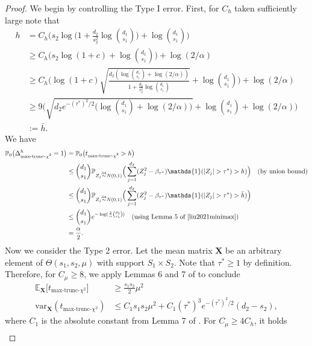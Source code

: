 \documentclass{article}
\newcommand{\X}{\mathbf{X}}
\newcommand{\bbP}{\mathbb{P}}
\newcommand{\EE}{\mathbb{E}}
\newcommand{\var}{\textrm{var}}
\newcommand{\one}{\mathds{1}}
\newcommand{\iid}{\overset{\textrm{iid}}{\sim}}
\newcommand{\chisqmax}{\text{max-trunc-$\chi^2$}}
\theoremstyle{remark}
\begin{document}
\begin{proof}
    We begin by controlling the Type I error. 
    First, for $C_h$ taken sufficiently large note that
    \begin{align*}
        h &= C_h\Big(s_2\log\Big(1 + \frac{d_2}{s_2^2}\log {d_1 \choose s_1}\Big) + \log {d_1 \choose s_1}\Big) \\
        &\geq C_h\Big(s_2\log(1 + c) + \log {d_1 \choose s_1}\Big) + 
        \log(2/\alpha)\\
        &\geq C_h\Big(\log(1+c)\sqrt{\frac{d_2(\log {d_1 \choose s_1} + \log(2/\alpha))}{1 + \frac{d_2}{s_2^2}\log {d_1 \choose s_1}}} + \log {d_1 \choose s_1}\Big) + \log(2/\alpha) \\
        &\geq 9\Bigg(\sqrt{d_2 e^{-(\tau^*)^2/2}\Big(\log{d_1 \choose s_1} + \log(2/\alpha)\Big)} + \log {d_1 \choose s_1} + \log(2/\alpha)\Bigg) \\
        &:= \bar{h}.
    \end{align*}
    We have 
    \begin{align*}
        \bbP_0\big(\Delta_\chisqmax^h = 1\big) &= \bbP_0\big(t_{\chisqmax} > h\big) \\
        &\leq {d_1 \choose s_1}\bbP_{Z_j \iid N(0,1)}\Big(\sum_{j = 1}^{d_2}(Z_j^2 - \beta_{\tau^*})\one(|Z_j| > \tau^*) > h)\Big) \quad \text{(by union bound)} \\
        &\leq {d_1 \choose s_1}\bbP_{Z_j \iid N(0,1)}\Big(\sum_{j = 1}^{d_2}(Z_j^2 - \beta_{\tau^*})\one(|Z_j| > \tau^*) > \bar{h})\Big) \\
        &\leq {d_1 \choose s_1} e^{-\log(\frac{2}{\alpha}{d_1 \choose s_1})} \quad \text{(using Lemma 5 of \cite{liu2021minimax})} \\
        &= \frac{\alpha}{2}.
    \end{align*}
    Now we consider the Type 2 error. Let the mean matrix $\X$ be an arbitrary element of $\Theta(s_1, s_2, \mu)$ with support $S_1 \times S_2$. Note that $\tau^* \geq 1$ by definition. Therefore, for $C_\mu \geq 8$, we apply Lemmas 6 and 7 of \cite{liu2021minimax} to conclude
    \begin{align*}
        \EE_{\X}\big[t_{\chisqmax}\big] &\geq \frac{s_1s_2}{2}\mu^2 \\
        \var_\X(t_{\chisqmax}) &\leq C_1s_1s_2\mu^2+C_1 (\tau^*)^3e^{-(\tau^*)^2/2}(d_2 - s_2),
    \end{align*}
    where $C_1$ is the absolute constant from Lemma 7 of \cite{liu2021minimax}. For $C_\mu \geq 4C_h$, it holds
    \begin{align*}

\end{align*}
\end{proof}
\end{document}
